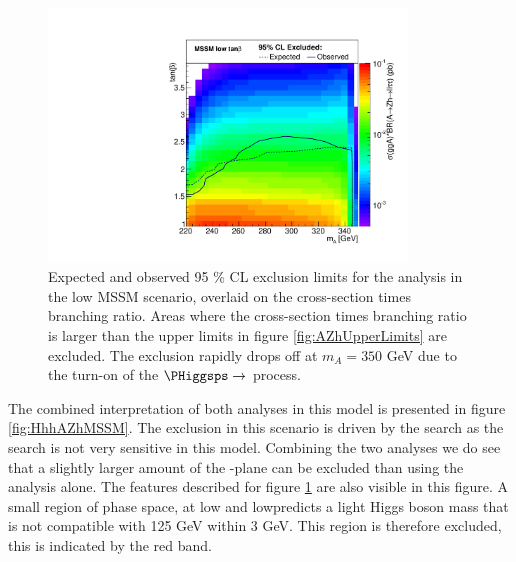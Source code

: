 \begin{figure}[h!]
\begin{center}
\includegraphics[width=0.85\textwidth]{Hhh/Plots/AZhlowtbhigh.pdf}
\caption{Expected and observed 95 \% CL exclusion limits for the \AtoZhtolltautau analysis
in the low \tanb MSSM scenario, overlaid on the cross-section times branching ratio. Areas where
the cross-section times branching ratio is larger than the upper limits in figure \ref{fig:AZhUpperLimits}
are excluded. The exclusion rapidly drops off at $m_A = 350$ GeV due to the turn-on of the
$ \PHiggsps \rightarrow$ \ttbar process.}
\label{fig:AZhlowtanbOverlaid}
\end{center}
\end{figure}


The combined interpretation of both analyses in this model is presented in figure \ref{fig:HhhAZhMSSM}.
The exclusion in this scenario is driven by the \AtoZh search as the \Htohh search is not
very sensitive in this model. Combining the two analyses we do see that a slightly larger amount
of the \mA-\tanb plane can be excluded than using the \AtoZhtolltautau analysis alone. The features
described for figure \ref{fig:AZhlowtanbOverlaid} are also visible in this figure. A small region of phase
space, at low \mA and low\tanb predicts a light Higgs boson mass that is not compatible with 125 GeV within 3 GeV.
This region is therefore excluded, this is indicated by the red band. 

